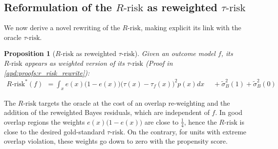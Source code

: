 \documentclass{report}
\newtheorem{proposition}{Proposition}
\begin{document}
\subsection{Reformulation of the $R\text{-risk}$ as reweighted $\tau\text{-risk}$}%
\label{theory:r_risk_rewrite}%

We now derive a novel rewriting of the $R\text{-risk}$, making explicit its link
with the oracle $\tau \text{-risk}$.

\begin{proposition}[$R \text{-risk}$ as reweighted
    $\tau\text{-risk}$]\label{theory:prop:r_risk_rewrite} Given an outcome model
  $f$, its $R\text{-risk}$ appears as weighted version of its $\tau\text{-risk}$
  (Proof in \ref{apd:proofs:r_risk_rewrite}):
  \begin{align}
    R\text{-risk}^*(f) & = \int_{x} e(x)\big(1-e(x)\big)\big(\tau(x)-\tau_ {f}(x)\big)^{2} p(x) d x  \quad\; + \tilde{\sigma}_B^2(1) + \tilde{\sigma}_B^{2}(0)
  \end{align}
\end{proposition}

The $R \text{-risk}$ targets the oracle at the cost of an overlap re-weighting
and the addition of the reweighted Bayes residuals, which are independent of
$f$. In good overlap regions the weights $e(x) \big(1-e(x) \big)$ are close to
$\frac{1}{4}$, hence the $R \text{-risk}$ is close to the desired gold-standard
$\tau \text{-risk}$. On the contrary, for units with extreme overlap violation,
these weights go down to zero with the propensity score.



\end{document}
